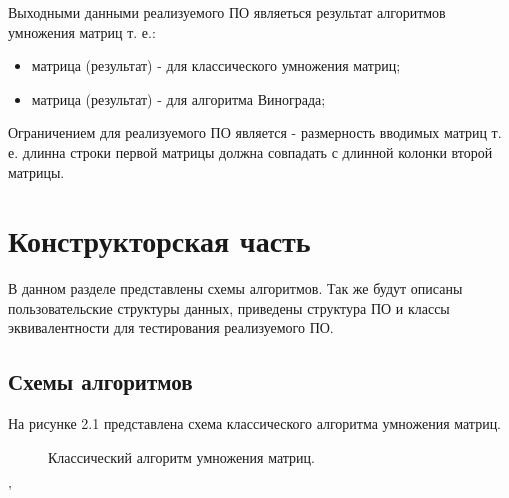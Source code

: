 \documentclass[12pt,a4paper]{report}
\begin{document}
Выходными данными реализуемого ПО являеться результат алгоритмов умножения матриц т. е.:
\begin{itemize}
	\item матрица (результат) - для классического умножения матриц;
	\item матрица (результат) - для алгоритма Винограда;
	
\end{itemize}
Ограничением для реализуемого ПО является - размерность вводимых матриц т. е. длинна строки первой матрицы должна совпадать с длинной колонки второй матрицы.

\newpage
\chapter{Конструкторская часть}

В данном разделе представлены схемы алгоритмов. Так же будут описаны пользовательские структуры данных, приведены структура ПО и классы эквивалентности для тестирования реализуемого ПО.



\section{Схемы алгоритмов}

На рисунке 2.1 представлена схема классического алгоритма умножения матриц.

\begin{figure}[ht]
	\caption{Классический алгоритм умножения матриц.}
\end{figure}'
\end{document}
